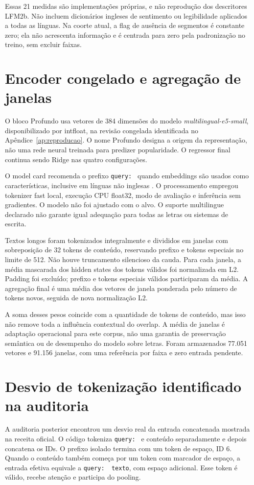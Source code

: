 Essas 21 medidas são implementações próprias, e não reprodução dos descritores LFM2b. Não incluem dicionários ingleses de sentimento ou legibilidade aplicados a todas as línguas. Na coorte atual, a flag de ausência de segmentos é constante zero; ela não acrescenta informação e é centrada para zero pela padronização no treino, sem excluir faixas.

\section{Encoder congelado e agregação de janelas}
O bloco Profundo usa vetores de 384 dimensões do modelo \emph{multilingual-e5-small}, disponibilizado por intfloat, na revisão congelada identificada no Apêndice~\ref{ap:reproducao}. O nome Profundo designa a origem da representação, não uma rede neural treinada para predizer popularidade. O regressor final continua sendo Ridge nas quatro configurações.

O model card recomenda o prefixo \texttt{query: } quando embeddings são usados como características, inclusive em línguas não inglesas \citep{e5card}. O processamento empregou tokenizer fast local, execução CPU float32, modo de avaliação e inferência sem gradientes. O modelo não foi ajustado com o alvo. O suporte multilingue declarado não garante igual adequação para todas as letras ou sistemas de escrita.

Textos longos foram tokenizados integralmente e divididos em janelas com sobreposição de 32 tokens de conteúdo, reservando prefixo e tokens especiais no limite de 512. Não houve truncamento silencioso da cauda. Para cada janela, a média mascarada dos hidden states dos tokens válidos foi normalizada em L2. Padding foi excluído; prefixo e tokens especiais válidos participaram da média. A agregação final é uma média dos vetores de janela ponderada pelo número de tokens novos, seguida de nova normalização L2.

A soma desses pesos coincide com a quantidade de tokens de conteúdo, mas isso não remove toda a influência contextual do overlap. A média de janelas é adaptação operacional para este corpus, não uma garantia de preservação semântica ou de desempenho do modelo sobre letras. Foram armazenados 77.051 vetores e 91.156 janelas, com uma referência por faixa e zero entrada pendente.

\section{Desvio de tokenização identificado na auditoria}
A auditoria posterior encontrou um desvio real da entrada concatenada mostrada na receita oficial. O código tokeniza \texttt{query: } e conteúdo separadamente e depois concatena os IDs. O prefixo isolado termina com um token de espaço, ID 6. Quando o conteúdo também começa por um token com marcador de espaço, a entrada efetiva equivale a \verb|query:  texto|, com espaço adicional. Esse token é válido, recebe atenção e participa do pooling.

